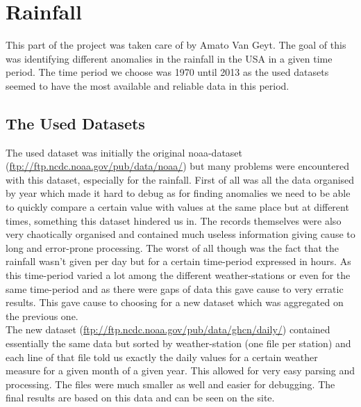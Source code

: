 \section{Rainfall}
This part of the project was taken care of by Amato Van Geyt. The goal of this was identifying different anomalies in the rainfall in the USA in a given time period. The time period we choose was 1970 until 2013 as the used datasets seemed to have the most available and reliable data in this period. \\ 

\subsection{The Used Datasets}
The used dataset was initially the original noaa-dataset (\url{ftp://ftp.ncdc.noaa.gov/pub/data/noaa/}) but many problems were encountered with this dataset, especially for the rainfall. First of all was all the data organised by year which made it hard to debug as for finding anomalies we need to be able to quickly compare a certain value with values at the same place but at different times, something this dataset hindered us in. The records themselves were also very chaotically organised and contained much useless information giving cause to long and error-prone processing. The worst of all though was the fact that the rainfall wasn't given per day but for a certain time-period expressed in hours. As this time-period varied a lot among the different weather-stations or even for the same time-period and as there were gaps of data this gave cause to very erratic results. This gave cause to choosing for a new dataset which was aggregated on the previous one. \\ 
The new dataset (\url{ftp://ftp.ncdc.noaa.gov/pub/data/ghcn/daily/}) contained essentially the same data but sorted by weather-station (one file per station) and each line of that file told us exactly the daily values for a certain weather measure for a given month of a given year. This allowed for very easy parsing and processing. The files were much smaller as well and easier for debugging. The final results are based on this data and can be seen on the site.\\ 

